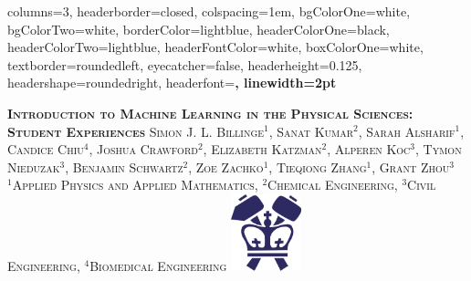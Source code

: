 \documentclass[landscape,paperwidth=40in,paperheight=30in,fontscale=0.32]{baposter} %
\begin{document}
\begin{poster}
{
columns=3,  %
headerborder=closed, %
colspacing=1em, %
bgColorOne=white, %
bgColorTwo=white, %
borderColor=lightblue, %
headerColorOne=black, %
headerColorTwo=lightblue, %
headerFontColor=white, %
boxColorOne=white, %
textborder=roundedleft, %
eyecatcher=false, %
headerheight=0.125\textheight, %
headershape=roundedright, %
headerfont=\Large\bf\textsc, %
linewidth=2pt %
}
%

{\bf\textsc{Introduction to Machine Learning in the Physical Sciences: \\Student Experiences}\vspace{0.25em}} %
{\textsc{Simon J. L. Billinge$^1$, Sanat Kumar$^2$, Sarah Alsharif$^1$, Candice Chiu$^4$, Joshua Crawford$^2$, Elizabeth Katzman$^2$, Alperen Koc$^3$, Tymon Nieduzak$^3$, Benjamin Schwartz$^2$, Zoe Zachko$^1$, Tieqiong Zhang$^1$, Grant Zhou$^3$\\%
$^1$Applied Physics and Applied Mathematics, $^2$Chemical Engineering, $^3$Civil Engineering, $^4$Biomedical Engineering}} %
{\includegraphics[height=6em]{figures/seas_logo.png}\hspace{0pt}} %



\end{poster}
\end{document}
